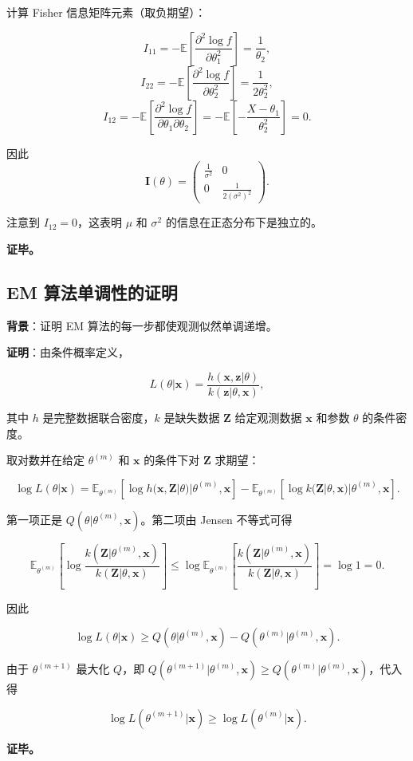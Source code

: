 计算 Fisher 信息矩阵元素（取负期望）：

\[
I_{11} = -\mathbb{E}\left[\frac{\partial^2 \log f}{\partial \theta_1^2}\right] = \frac{1}{\theta_2},
\]
\[
I_{22} = -\mathbb{E}\left[\frac{\partial^2 \log f}{\partial \theta_2^2}\right] = \frac{1}{2\theta_2^2},
\]
\[
I_{12} = -\mathbb{E}\left[\frac{\partial^2 \log f}{\partial \theta_1\partial\theta_2}\right] = -\mathbb{E}\left[-\frac{X-\theta_1}{\theta_2^2}\right] = 0.
\]

因此
\[
\mathbf{I}(\theta) = \begin{pmatrix} \frac{1}{\sigma^2} & 0 \\ 0 & \frac{1}{2(\sigma^2)^2} \end{pmatrix}.
\]

注意到 $I_{12} = 0$，这表明 $\mu$ 和 $\sigma^2$ 的信息在正态分布下是独立的。

\textbf{证毕。}

\subsection{EM 算法单调性的证明}\label{sec:em-monotonicity-proof}

\textbf{背景}：证明 EM 算法的每一步都使观测似然单调递增。

\textbf{证明}：由条件概率定义，

\[
L(\theta|\mathbf{x}) = \frac{h(\mathbf{x}, \mathbf{z}|\theta)}{k(\mathbf{z}|\theta, \mathbf{x})},
\]

其中 $h$ 是完整数据联合密度，$k$ 是缺失数据 $\mathbf{Z}$ 给定观测数据 $\mathbf{x}$ 和参数 $\theta$ 的条件密度。

取对数并在给定 $\theta^{(m)}$ 和 $\mathbf{x}$ 的条件下对 $\mathbf{Z}$ 求期望：

\[
\log L(\theta|\mathbf{x}) = \mathbb{E}_{\theta^{(m)}}\left[\log h(\mathbf{x}, \mathbf{Z}|\theta) | \theta^{(m)}, \mathbf{x}\right] - \mathbb{E}_{\theta^{(m)}}\left[\log k(\mathbf{Z}|\theta, \mathbf{x}) | \theta^{(m)}, \mathbf{x}\right].
\]

第一项正是 $Q(\theta|\theta^{(m)}, \mathbf{x})$。第二项由 Jensen 不等式可得

\[
\mathbb{E}_{\theta^{(m)}}\left[\log \frac{k(\mathbf{Z}|\theta^{(m)}, \mathbf{x})}{k(\mathbf{Z}|\theta, \mathbf{x})}\right] \leq \log \mathbb{E}_{\theta^{(m)}}\left[\frac{k(\mathbf{Z}|\theta^{(m)}, \mathbf{x})}{k(\mathbf{Z}|\theta, \mathbf{x})}\right] = \log 1 = 0.
\]

因此

\[
\log L(\theta|\mathbf{x}) \geq Q(\theta|\theta^{(m)}, \mathbf{x}) - Q(\theta^{(m)}|\theta^{(m)}, \mathbf{x}).
\]

由于 $\theta^{(m+1)}$ 最大化 $Q$，即 $Q(\theta^{(m+1)}|\theta^{(m)}, \mathbf{x}) \geq Q(\theta^{(m)}|\theta^{(m)}, \mathbf{x})$，代入得

\[
\log L(\theta^{(m+1)}|\mathbf{x}) \geq \log L(\theta^{(m)}|\mathbf{x}).
\]

\textbf{证毕。}

